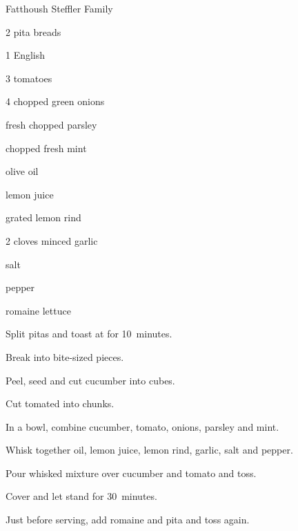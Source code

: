 \begin{recipe}{ Fatthoush }{Steffler Family}{}

\begin{ingredients}
\item 2 pita breads
\item 1 English 
\item 3 tomatoes
\item 4 chopped green onions
\item \C{\half} fresh chopped parsley
\item \C{\quarter} chopped fresh mint
\item {} olive oil
\item {} lemon juice
\item {} grated lemon rind
\item 2 cloves minced garlic
\item \tp{\half} salt
\item \tp{\half} pepper
\item {} romaine lettuce
\end{ingredients}

\begin{directions}
\item Split pitas and toast at  for 10~minutes.
\item Break into bite-sized pieces.
\item Peel, seed and cut cucumber into  cubes.
\item Cut tomated into  chunks.
\item In a bowl, combine cucumber, tomato, onions, parsley and mint.
\item Whisk together oil, lemon juice, lemon rind, garlic, salt and pepper.
\item Pour whisked mixture over cucumber and tomato and toss.
\item Cover and let stand for 30~minutes.
\item Just before serving, add romaine and pita and toss again.
\end{directions}
\end{recipe}

